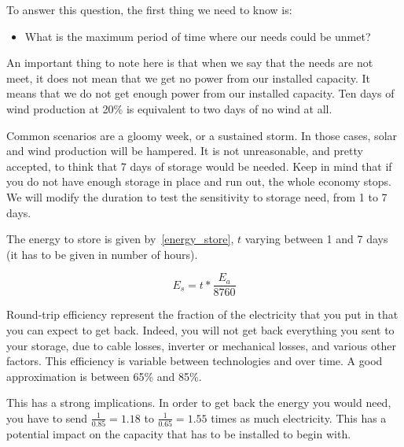 To answer this question, the first thing we need to know is:

\begin{itemize}
\item What is the maximum period of time where our needs could be unmet?
\end{itemize}

An important thing to note here is that when we say that the needs are not meet, it does not mean that we get no power from our installed capacity. It means that we do not get enough power from our installed capacity. Ten days of wind production at 20\% is equivalent to two days of no wind at all.

Common scenarios are a gloomy week, or a sustained storm. In those cases, solar and wind production will be hampered. It is not unreasonable, and pretty accepted, to think that 7 days of storage would be needed. Keep in mind that if you do not have enough storage in place and run out, the whole economy stops. We will modify the duration to test the sensitivity to storage need, from 1 to 7 days.


\begin{remark}
The energy to store is given by~\ref{energy_store}, $t$ varying between 1 and 7 days (it has to be given in number of hours).

\begin{equation}\label{energy_store}
E_s = t * \frac{E_a}{8760}
\end{equation}

\end{remark}

Round-trip efficiency represent the fraction of the electricity that you put in that you can expect to get back. Indeed, you will not get back everything you sent to your storage, due to cable losses, inverter or mechanical losses, and various other factors. This efficiency is variable between technologies and over time. A good approximation is between 65\% and 85\%. 

This has a strong implications. In order to get back the energy you would need, you have to send $\frac{1}{0.85} = 1.18$ to $\frac{1}{0.65} = 1.55$ times as much electricity. This has a potential impact on the capacity that has to be installed to begin with.

